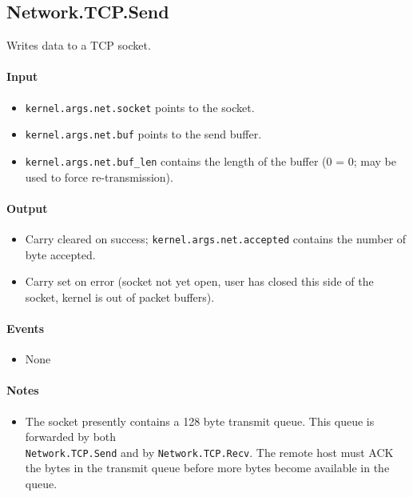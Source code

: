 \subsection*{Network.TCP.Send}
Writes data to a TCP socket.

\paragraph{Input}
\begin{itemize}
\item \verb+kernel.args.net.socket+ points to the socket.
\item \verb+kernel.args.net.buf+ points to the send buffer.
\item \verb+kernel.args.net.buf_len+ contains the length of the buffer (0 = 0; may be used to force re-transmission).
\end{itemize}

\paragraph{Output}
\begin{itemize}
\item Carry cleared on success; \verb+kernel.args.net.accepted+ contains the number of byte accepted.
\item Carry set on error (socket not yet open, user has closed this side of the socket, kernel is out of packet buffers).
\end{itemize}

\paragraph{Events}
\begin{itemize}
\item None
\end{itemize}

\paragraph{Notes}
\begin{itemize}
\item The socket presently contains a 128 byte transmit queue.  This queue is forwarded by both \\ \verb+Network.TCP.Send+ and by \verb+Network.TCP.Recv+.  The remote host must ACK the bytes in the transmit queue before more bytes become available in the queue.
\end{itemize}


